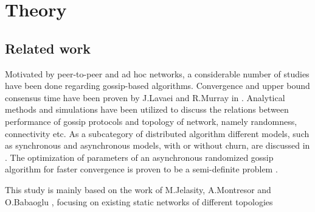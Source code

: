\section{Theory}
\label{sec:theory}
\subsection{Related work}
Motivated by peer-to-peer and ad hoc networks, a considerable number of studies have been done regarding gossip-based algorithms. Convergence and upper bound consensus time have been proven by J.Lavaei and R.Murray in \cite{5929538}. Analytical methods and simulations have been utilized to discuss the relations between performance of gossip protocols and topology of network, namely randomness, connectivity etc. As a subcategory of distributed algorithm different models, such as synchronous and asynchronous models, with or without churn, are discussed in \cite{Lynch:1996:DA:525656}. The optimization of parameters of an asynchronous randomized gossip algorithm for faster convergence is proven to be a semi-definite problem \cite{Boyd2004}.

This study is mainly based on the work of M.Jelasity, A.Montresor and O.Babaoglu \cite{jelasity_gossip-based_2005}, focusing on existing static networks of different topologies \cite{knight_internet_2011}

